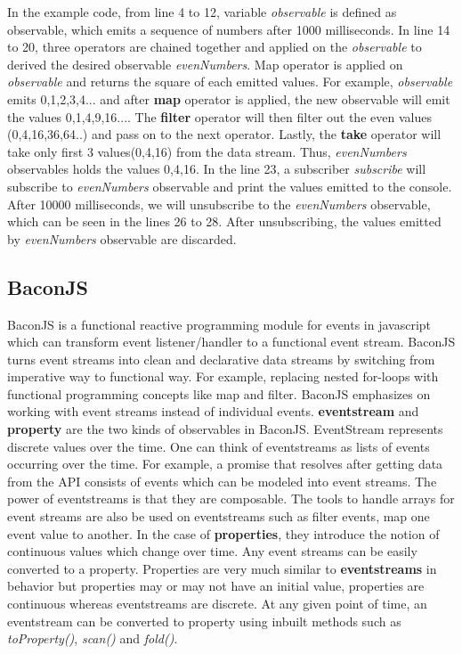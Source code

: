 In the example code, from line 4 to 12, variable \textit{observable} is defined as observable, which emits a sequence of numbers after 1000 milliseconds. In line 14 to 20, three operators are chained together and applied on the \textit{observable} to derived the desired observable \textit{evenNumbers}. Map operator is applied on \textit{observable} and returns the square of each emitted values. For example, \textit{observable} emits 0,1,2,3,4... and after \textbf{map} operator is applied, the new observable will emit the values 0,1,4,9,16.... The \textbf{filter} operator will then filter out the even values (0,4,16,36,64..) and pass on to the next operator. Lastly, the \textbf{take} operator will take only first 3 values(0,4,16) from the data stream. Thus, \textit{evenNumbers} observables holds the values 0,4,16. In the line 23, a subscriber \textit{subscribe} will subscribe to \textit{evenNumbers} observable and print the values emitted to the console. After 10000 milliseconds, we will unsubscribe to the \textit{evenNumbers} observable, which can be seen in the lines 26 to 28. After unsubscribing, the values emitted by \textit{evenNumbers} observable are discarded.


\subsection{BaconJS}
BaconJS is a functional reactive programming module for events in javascript which can transform event listener/handler to a functional event stream. BaconJS turns event streams into clean and declarative data streams by switching from imperative way to functional way. For example, replacing nested for-loops with functional programming concepts like map and filter. BaconJS emphasizes on working with event streams instead of individual events. \textbf{eventstream} and \textbf{property} are the two kinds of observables in BaconJS. EventStream represents discrete values over the time. One can think of eventstreams as lists of events occurring over the time. For example, a promise that resolves after getting data from the API consists of events which can be modeled into event streams. The power of eventstreams is that they are composable. The tools to handle arrays for event streams are also be used on eventstreams such as filter events, map one event value to another. In the case of \textbf{properties}, they introduce the notion of continuous values which change over time. Any event streams can be easily converted to a property.  Properties are very much similar to \textbf{eventstreams} in behavior but properties may or may not have an initial value, properties are continuous whereas eventstreams are discrete. At any given point of time, an eventstream can be converted to property using inbuilt methods such as \textit{toProperty()}, \textit{scan()} and \textit{fold()}\cite{baconBlog}. 


